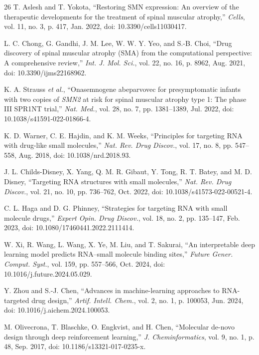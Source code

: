 \documentclass[journal]{IEEEtran}
\begin{document}
\begin{thebibliography}{26}
T. Aslesh and T. Yokota, ``Restoring SMN expression: An overview of the
therapeutic developments for the treatment of spinal muscular
atrophy,'' \emph{Cells}, vol. 11, no. 3, p. 417, Jan. 2022, doi:
10.3390/cells11030417.

L. C. Chong, G. Gandhi, J. M. Lee, W. W. Y. Yeo, and S.-B. Choi, ``Drug
discovery of spinal muscular atrophy (SMA) from the computational
perspective: A comprehensive review,'' \emph{Int. J. Mol. Sci.},
vol. 22, no. 16, p. 8962, Aug. 2021, doi: 10.3390/ijms22168962.

K. A. Strauss \emph{et al.}, ``Onasemnogene abeparvovec for
presymptomatic infants with two copies of \emph{SMN2} at risk for spinal
muscular atrophy type 1: The phase III SPR1NT trial,'' \emph{Nat. Med.},
vol. 28, no. 7, pp. 1381--1389, Jul. 2022, doi:
10.1038/s41591-022-01866-4.

K. D. Warner, C. E. Hajdin, and K. M. Weeks, ``Principles for targeting
RNA with drug-like small molecules,'' \emph{Nat. Rev. Drug Discov.},
vol. 17, no. 8, pp. 547--558, Aug. 2018, doi: 10.1038/nrd.2018.93.

J. L. Childs-Disney, X. Yang, Q. M. R. Gibaut, Y. Tong, R. T. Batey, and
M. D. Disney, ``Targeting RNA structures with small molecules,''
\emph{Nat. Rev. Drug Discov.}, vol. 21, no. 10, pp. 736--762, Oct. 2022,
doi: 10.1038/s41573-022-00521-4.

C. L. Haga and D. G. Phinney, ``Strategies for targeting RNA with small
molecule drugs,'' \emph{Expert Opin. Drug Discov.}, vol. 18, no. 2,
pp. 135--147, Feb. 2023, doi: 10.1080/17460441.2022.2111414.

W. Xi, R. Wang, L. Wang, X. Ye, M. Liu, and T. Sakurai, ``An
interpretable deep learning model predicts RNA--small molecule binding
sites,'' \emph{Future Gener. Comput. Syst.}, vol. 159, pp. 557--566,
Oct. 2024, doi: 10.1016/j.future.2024.05.029.

Y. Zhou and S.-J. Chen, ``Advances in machine-learning approaches to
RNA-targeted drug design,'' \emph{Artif. Intell. Chem.}, vol. 2, no. 1,
p. 100053, Jun. 2024, doi: 10.1016/j.aichem.2024.100053.

M. Olivecrona, T. Blaschke, O. Engkvist, and H. Chen, ``Molecular
de-novo design through deep reinforcement learning,'' \emph{J.
Cheminformatics}, vol. 9, no. 1, p. 48, Sep. 2017, doi:
10.1186/s13321-017-0235-x.


\end{thebibliography}
\end{document}
